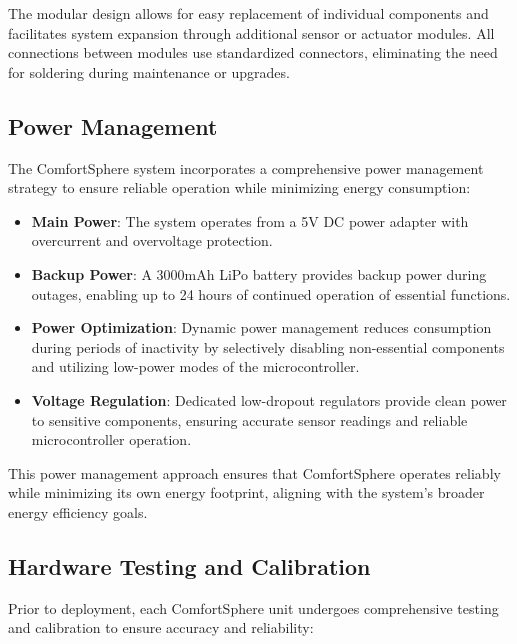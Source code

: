 \documentclass[a4paper]{scrartcl}
\begin{document}
    The modular design allows for easy replacement of individual components and facilitates system expansion through additional sensor or actuator modules. All connections between modules use standardized connectors, eliminating the need for soldering during maintenance or upgrades.
    
    \subsection{Power Management}
    The ComfortSphere system incorporates a comprehensive power management strategy to ensure reliable operation while minimizing energy consumption:
    
    \begin{itemize}
        \item \textbf{Main Power}: The system operates from a 5V DC power adapter with overcurrent and overvoltage protection.
        \item \textbf{Backup Power}: A 3000mAh LiPo battery provides backup power during outages, enabling up to 24 hours of continued operation of essential functions.
        \item \textbf{Power Optimization}: Dynamic power management reduces consumption during periods of inactivity by selectively disabling non-essential components and utilizing low-power modes of the microcontroller.
        \item \textbf{Voltage Regulation}: Dedicated low-dropout regulators provide clean power to sensitive components, ensuring accurate sensor readings and reliable microcontroller operation.
    \end{itemize}
    
    This power management approach ensures that ComfortSphere operates reliably while minimizing its own energy footprint, aligning with the system's broader energy efficiency goals.
    
    \subsection{Hardware Testing and Calibration}
    Prior to deployment, each ComfortSphere unit undergoes comprehensive testing and calibration to ensure accuracy and reliability:
    
\end{document}
